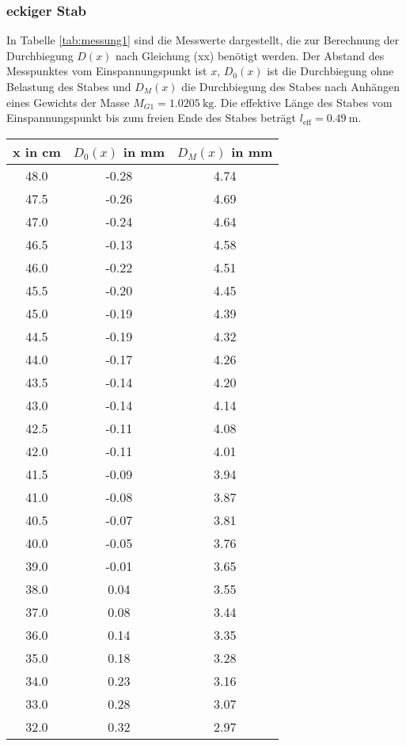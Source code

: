 \subsubsection{eckiger Stab}
In Tabelle \ref{tab:messung1} sind die Messwerte dargestellt, die zur Berechnung
der Durchbiegung $D(x)$ nach Gleichung (xx) benötigt werden. Der Abstand des
Messpunktes vom Einspannungspunkt ist $x$, $D_0(x)$ ist die Durchbiegung ohne
Belastung des Stabes und $D_M(x)$ die Durchbiegung des Stabes nach Anhängen
eines Gewichts der Masse $M_{G1} = \SI{1.0205}{\kilo\gram}$. Die effektive Länge
des Stabes vom Einspannungspunkt bis zum freien Ende des Stabes beträgt
$l_\text{eff} = \SI{0.49}{\meter}$.
\begin{table}
  \centering
  \begin{tabular}{c c c}
    \toprule
    x in \si{\centi\meter} & $D_0(x)$ in \si{\milli\meter} & $D_M(x)$ in \si{\milli\meter} \\
    \midrule
    48.0	&	-0.28	&	4.74 \\
    47.5	&	-0.26	&	4.69 \\
    47.0	&	-0.24	&	4.64 \\
    46.5	&	-0.13	&	4.58 \\
    46.0	&	-0.22	&	4.51 \\
    45.5	&	-0.20	&	4.45 \\
    45.0	&	-0.19	&	4.39 \\
    44.5	&	-0.19	&	4.32 \\
    44.0	&	-0.17	&	4.26 \\
    43.5	&	-0.14	&	4.20 \\
    43.0	&	-0.14	&	4.14 \\
    42.5	&	-0.11	&	4.08 \\
    42.0	&	-0.11	&	4.01 \\
    41.5	&	-0.09	&	3.94 \\
    41.0	&	-0.08	&	3.87 \\
    40.5	&	-0.07	&	3.81 \\
    40.0	&	-0.05	&	3.76 \\
    39.0	&	-0.01	&	3.65 \\
    38.0	&	0.04	&	3.55 \\
    37.0	&	0.08	&	3.44 \\
    36.0	&	0.14	&	3.35 \\
    35.0	&	0.18	&	3.28 \\
    34.0	&	0.23	&	3.16 \\
    33.0	&	0.28	&	3.07 \\
    32.0	&	0.32	&	2.97 \\

\end{tabular}
\end{table}

